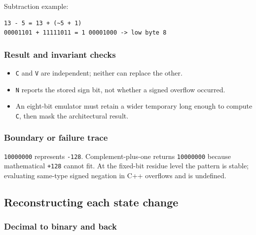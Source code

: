 Subtraction example:

\begin{verbatim}
13 - 5 = 13 + (~5 + 1)
00001101 + 11111011 = 1 00001000 -> low byte 8
\end{verbatim}

\subsubsection{Result and invariant checks}\label{appendix-92ff77d4dfdc-result-and-invariant-checks-1}

\hypertarget{appendix-92ff77d4dfdc-result-and-invariant-checks-1}{}

\begin{itemize}
\tightlist
\item
  \texttt{C} and \texttt{V} are independent; neither can replace the other.
\item
  \texttt{N} reports the stored sign bit, not whether a signed overflow occurred.
\item
  An eight-bit emulator must retain a wider temporary long enough to compute \texttt{C}, then mask the architectural result.
\end{itemize}

\subsubsection{Boundary or failure trace}\label{appendix-92ff77d4dfdc-boundary-or-failure-trace-1}

\hypertarget{appendix-92ff77d4dfdc-boundary-or-failure-trace-1}{}

\texttt{10000000} represents \texttt{-128}. Complement-plus-one returns \texttt{10000000} because mathematical \texttt{+128} cannot fit. At the fixed-bit residue level the pattern is stable; evaluating same-type signed negation in C++ overflows and is undefined.

\subsection{Reconstructing each state change}\label{appendix-92ff77d4dfdc-reconstructing-each-state-change}

\hypertarget{appendix-92ff77d4dfdc-reconstructing-each-state-change}{}

\subsubsection{Decimal to binary and back}\label{appendix-92ff77d4dfdc-decimal-to-binary-and-back}

